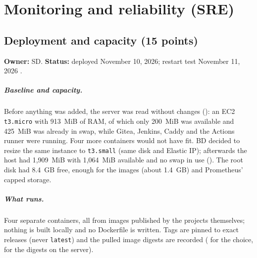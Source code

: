 \chapter{Monitoring and reliability (SRE)}


\section{Deployment and capacity (15 points)}\label{Section:sreDeployment}
\textbf{Owner:} SD. \textbf{Status:} deployed November 10, 2026; restart test November 11, 2026 \StatusPass.

\paragraph{Baseline and capacity.} Before anything was added, the server was read without changes ():
an EC2 \texttt{t3.micro} with 913~MiB of RAM, of which only 200~MiB was available and 425~MiB was already in swap, while
Gitea, Jenkins, Caddy and the Actions runner were running. Four more containers would not have fit. BD decided to resize
the same instance to \texttt{t3.small} (same disk and Elastic IP); afterwards the host had 1,909~MiB with 1,064~MiB
available and no swap in use (). The root disk had 8.4~GB free, enough for the images (about 1.4~GB) and
Prometheus' capped storage.

\paragraph{What runs.} Four separate containers, all from images published by the projects themselves; nothing is built
locally and no Dockerfile is written. Tags are pinned to exact releases (never \texttt{latest}) and the pulled image
digests are recorded ( for the choice,  for the digests on the server).

